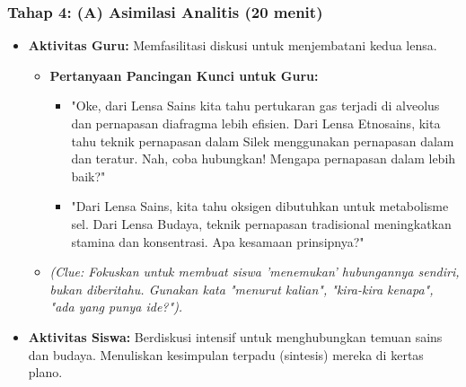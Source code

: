 \documentclass[a4paper,12pt]{article}
\begin{document}
\subsubsection{Tahap 4: (A) Asimilasi Analitis (20 menit)}
\begin{itemize}
\item \textbf{Aktivitas Guru:} Memfasilitasi diskusi untuk menjembatani kedua lensa.
    \begin{itemize}
    \item \textbf{Pertanyaan Pancingan Kunci untuk Guru:}
        \begin{itemize}
        \item "Oke, dari Lensa Sains kita tahu pertukaran gas terjadi di alveolus dan pernapasan diafragma lebih efisien. Dari Lensa Etnosains, kita tahu teknik pernapasan dalam Silek menggunakan pernapasan dalam dan teratur. Nah, coba hubungkan! Mengapa pernapasan dalam lebih baik?"
        \item "Dari Lensa Sains, kita tahu oksigen dibutuhkan untuk metabolisme sel. Dari Lensa Budaya, teknik pernapasan tradisional meningkatkan stamina dan konsentrasi. Apa kesamaan prinsipnya?"
        \end{itemize}
    \item \textit{(Clue: Fokuskan untuk membuat siswa 'menemukan' hubungannya sendiri, bukan diberitahu. Gunakan kata "menurut kalian", "kira-kira kenapa", "ada yang punya ide?").}
    \end{itemize}
\item \textbf{Aktivitas Siswa:} Berdiskusi intensif untuk menghubungkan temuan sains dan budaya. Menuliskan kesimpulan terpadu (sintesis) mereka di kertas plano.
\end{itemize}
\end{document}
